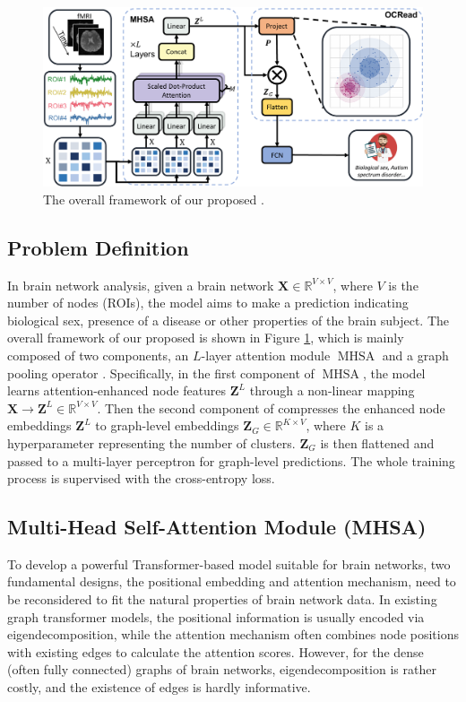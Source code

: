 \section{\methodfull}

\begin{figure}[ht]
    \centering
    \includegraphics[width=0.8\linewidth]{figures/process.pdf}
    \caption{The overall framework of our proposed \methodfull.}
    \label{fig:model}
\end{figure}

\subsection{Problem Definition}
In brain network analysis, given a brain network $\bm X\in \mathbb{R}^{V \times V}$, where $V$ is the number of nodes (ROIs), the model aims to make a prediction indicating biological sex, presence of a disease or other properties of the brain subject. The overall framework of our proposed \methodfull is shown in Figure \ref{fig:model}, which is mainly composed of two components, an $L$-layer attention module $\operatorname{MHSA}$ and a graph pooling operator \poolingshort.
Specifically, in the first component of $\operatorname{MHSA}$, the model learns attention-enhanced node features $\bm Z^L$ through a non-linear mapping $\bm X \rightarrow \bm Z^L \in \mathbb{R}^{V \times V}$. Then the second component of \poolingshort compresses the enhanced node embeddings $\bm Z^L$ to graph-level embeddings $\bm Z_G \in \mathbb{R}^{K \times V}$, where $K$ is a hyperparameter representing the number of clusters. $\bm Z_G$ is then flattened and passed to a multi-layer perceptron for graph-level predictions. The whole training process is supervised with the cross-entropy loss.

\subsection{Multi-Head Self-Attention Module (MHSA)}
To develop a powerful Transformer-based model suitable for brain networks, two fundamental designs, the positional embedding and attention mechanism, need to be reconsidered to fit the natural properties of brain network data. In existing graph transformer models, the positional information is usually encoded via eigendecomposition, while the attention mechanism often combines node positions with existing edges to calculate the attention scores. However, for the dense (often fully connected) graphs of brain networks, eigendecomposition is rather costly, and the existence of edges is hardly informative.

